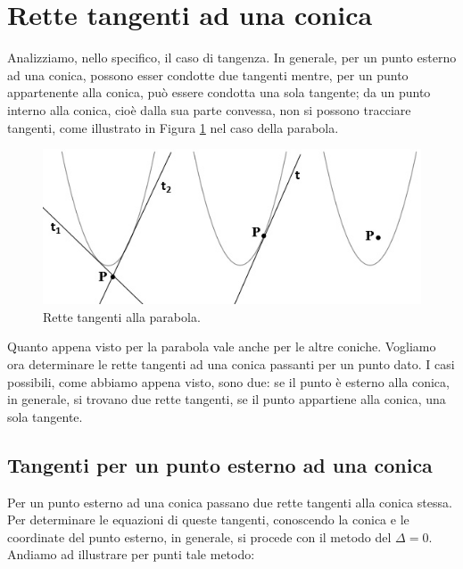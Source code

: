 \section{Rette tangenti ad una conica}
\label{sec:coniche_tangenti}

Analizziamo, nello specifico, il caso di tangenza. In generale, per un 
punto esterno ad una conica, possono esser condotte due tangenti mentre, per 
un punto appartenente alla conica, può essere condotta una sola tangente;  
da un punto interno alla conica, cioè dalla sua parte convessa, non si 
possono tracciare tangenti, come illustrato in Figura \ref{fig:ellissedalcono} nel caso della 
parabola. 

\begin{figure}[t]
  \centering
  \includegraphics[scale=0.8]{img/tangenti2.jpg}
  \caption{Rette tangenti alla parabola.}%
  \label{fig:ellissedalcono}
\end{figure}

Quanto appena visto per la parabola vale anche per le altre coniche.
Vogliamo ora determinare le rette tangenti ad una conica passanti per un 
punto dato. I casi possibili, come abbiamo appena visto, sono due: se il 
punto è esterno alla conica, in generale, si trovano due rette tangenti, se 
il punto appartiene alla conica, una sola tangente.

\subsection{Tangenti per un punto esterno ad una conica}

Per un punto esterno ad una conica passano due rette tangenti alla conica 
stessa. Per determinare le equazioni di queste tangenti, conoscendo la 
conica e le coordinate del punto esterno, in generale, si procede con il 
metodo del \( \Delta =0\). Andiamo ad illustrare per punti tale metodo:


